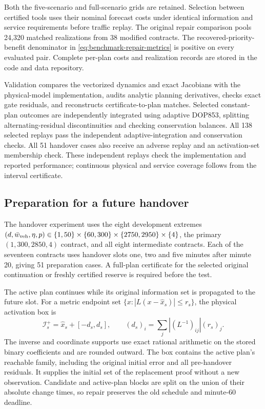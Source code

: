\documentclass[journal,10pt]{IEEEtran}
\begin{document}
Both the five-scenario and full-scenario grids are retained. Selection
between certified tools uses their nominal forecast costs under identical
information and service requirements before traffic replay. The original
repair comparison pools 24,320 matched realizations from 38 modified
contracts. The recovered-priority-benefit denominator in
\eqref{eq:benchmark-repair-metrics} is positive on every evaluated pair.
Complete per-plan costs and realization records are stored in the code
and data repository.

Validation compares the vectorized dynamics and exact Jacobians with the
physical-model implementation, audits analytic planning derivatives,
checks exact gate residuals, and reconstructs certificate-to-plan matches.
Selected constant-plan outcomes are independently integrated using
adaptive DOP853, splitting alternating-residual discontinuities and
checking conservation balances. All 138 selected replays pass the independent adaptive-integration and
conservation checks. All 51 handover cases also receive an adverse replay and an
activation-set membership check. These independent replays check the
implementation and reported performance; continuous physical and service
coverage follows from the interval certificate.

\subsection{Preparation for a future handover}
\label{supp:detail:sec:delayed-handover-results}
The handover experiment uses the eight development extremes
$(d,\bar w_{\rm veh},\eta,p)\in\{1,50\}\times\{60,300\}\times
\{2750,2950\}\times\{4\}$, the primary $(1,300,2850,4)$ contract,
and all eight intermediate contracts. Each of the seventeen contracts
uses handover slots one, two and five minutes after minute 20, giving
51 preparation cases. A full-plan certificate for the selected original
continuation or freshly certified reserve is required before the test.

The active plan continues while its original information set is
propagated to the future slot. For a metric endpoint set
$\{x:|L(x-\widehat x_s)|\le r_s\}$, the physical activation box is
\begin{equation}
\mathcal I_s^+=\widehat x_s+[-d_s,d_s],\qquad
(d_s)_i=\sum_j|(L^{-1})_{ij}|(r_s)_j.
\label{eq:benchmark-handover-box}
\end{equation}
The inverse and coordinate supports use exact rational arithmetic on the
stored binary coefficients and are rounded outward. The box contains the
active plan's reachable family, including the original initial error and
all pre-handover residuals. It supplies the initial set of the replacement
proof without a new observation. Candidate and active-plan blocks are
split on the union of their absolute change times, so repair preserves
the old schedule and minute-60 deadline.
\end{document}
